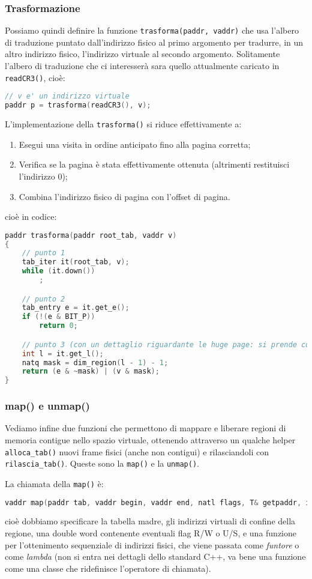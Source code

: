 \documentclass[a4paper,11pt]{article}
\begin{document}
\subsubsection{Trasformazione}
Possiamo quindi definire la funzione \lstinline|trasforma(paddr, vaddr)| che usa l'albero di traduzione puntato dall'indirizzo fisico al primo argomento per tradurre, in un altro indirizzo fisico, l'indirizzo virtuale al secondo argomento.
Solitamente l'albero di traduzione che ci interesserà sara quello attualmente caricato in \lstinline|readCR3()|, cioè:
\begin{lstlisting}[language=C++, style=codestyle]	
// v e' un indirizzo virtuale
paddr p = trasforma(readCR3(), v);
\end{lstlisting}

L'implementazione della \lstinline|trasforma()| si riduce effettivamente a:
\begin{enumerate}
	\item Esegui una visita in ordine anticipato fino alla pagina corretta;
	\item Verifica se la pagina è stata effettivamente ottenuta (altrimenti restituisci l'indirizzo 0);
	\item Combina l'indirizzo fisico di pagina con l'offset di pagina. 
\end{enumerate}
cioè in codice:
\begin{lstlisting}[language=C++, style=codestyle]	
paddr trasforma(paddr root_tab, vaddr v)
{
	// punto 1
	tab_iter it(root_tab, v);
	while (it.down())
		;

	// punto 2
	tab_entry e = it.get_e();
	if (!(e & BIT_P))
		return 0;

	// punto 3 (con un dettaglio riguardante le huge page: si prende come offset la maschera ottenuta da dim_region())
	int l = it.get_l();
	natq mask = dim_region(l - 1) - 1;
	return (e & ~mask) | (v & mask);
}
\end{lstlisting}

\subsubsection{map() e unmap()}
Vediamo infine due funzioni che permettono di mappare e liberare regioni di memoria contigue nello spazio virtuale, ottenendo attraverso un qualche helper \lstinline|alloca_tab()| nuovi frame fisici (anche non contigui) e rilasciandoli con \lstinline|rilascia_tab()|.
Queste sono la \lstinline|map()| e la \lstinline|unmap()|.

La chiamata della \lstinline|map()| è:
\begin{lstlisting}[language=C++, style=codestyle]	
vaddr map(paddr tab, vaddr begin, vaddr end, natl flags, T& getpaddr, int ps_lvl = 1)
\end{lstlisting}
cioè dobbiamo specificare la tabella madre, gli indirizzi virtuali di confine della regione, una double word contenente eventuali flag R/W o U/S, e una funzione per l'ottenimento sequenziale di indirizzi fisici, che viene passata come \textit{funtore} o come \textit{lambda} (non si entra nei dettagli dello standard C++, va bene una funzione come una classe che ridefinisce l'operatore di chiamata).
\end{document}
